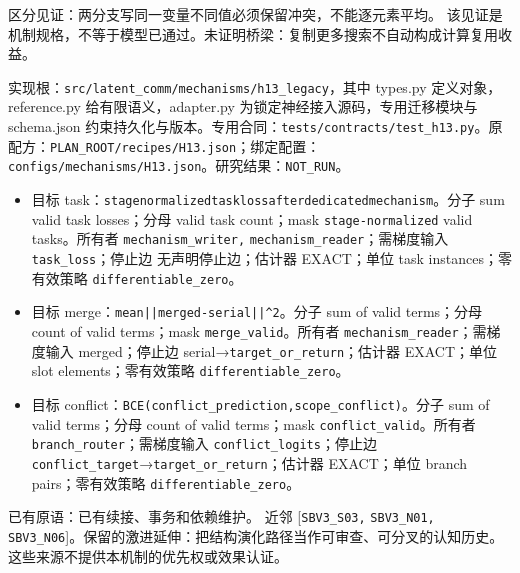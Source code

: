 \documentclass[
  10pt,
]{article}
\begin{document}
区分见证：两分支写同一变量不同值必须保留冲突，不能逐元素平均。
该见证是机制规格，不等于模型已通过。未证明桥梁：复制更多搜索不自动构成计算复用收益。

实现根：{\small\nolinkurl{src/latent_comm/mechanisms/h13_legacy}}，其中
types.py 定义对象，reference.py 给有限语义，adapter.py
为锁定神经接入源码，专用迁移模块与 schema.json
约束持久化与版本。专用合同：{\small\nolinkurl{tests/contracts/test_h13.py}}。原配方：{\small\nolinkurl{PLAN_ROOT/recipes/H13.json}}；绑定配置：{\small\nolinkurl{configs/mechanisms/H13.json}}。研究结果：\nolinkurl{NOT_RUN}。

\begin{itemize}
\item
  目标
  task：{\small\nolinkurl{stage}\hspace{0.333em}\nolinkurl{normalized}\hspace{0.333em}\nolinkurl{task}\hspace{0.333em}\nolinkurl{loss}\hspace{0.333em}\nolinkurl{after}\hspace{0.333em}\nolinkurl{dedicated}\hspace{0.333em}\nolinkurl{mechanism}}。分子
  sum valid task losses；分母 valid task count；mask
  \nolinkurl{stage-normalized} valid tasks。所有者
  \nolinkurl{mechanism_writer,} \nolinkurl{mechanism_reader}；需梯度输入
  \nolinkurl{task_loss}；停止边 无声明停止边；估计器 EXACT；单位 task
  instances；零有效策略 \nolinkurl{differentiable_zero}。
\item
  目标
  merge：{\small\nolinkurl{mean}\hspace{0.333em}\nolinkurl{||merged-serial||^2}}。分子
  sum of valid terms；分母 count of valid terms；mask
  \nolinkurl{merge_valid}。所有者
  \nolinkurl{mechanism_reader}；需梯度输入 merged；停止边
  serial→\nolinkurl{target_or_return}；估计器 EXACT；单位 slot
  elements；零有效策略 \nolinkurl{differentiable_zero}。
\item
  目标
  conflict：{\small\nolinkurl{BCE(conflict_prediction,scope_conflict)}}。分子
  sum of valid terms；分母 count of valid terms；mask
  \nolinkurl{conflict_valid}。所有者
  \nolinkurl{branch_router}；需梯度输入
  \nolinkurl{conflict_logits}；停止边
  \nolinkurl{conflict_target}→\nolinkurl{target_or_return}；估计器
  EXACT；单位 branch pairs；零有效策略 \nolinkurl{differentiable_zero}。
\end{itemize}

已有原语：已有续接、事务和依赖维护。 近邻 {[}\nolinkurl{SBV3_S03,}
\nolinkurl{SBV3_N01,}
\nolinkurl{SBV3_N06}{]}。保留的激进延伸：把结构演化路径当作可审查、可分叉的认知历史。
这些来源不提供本机制的优先权或效果认证。
\end{document}
